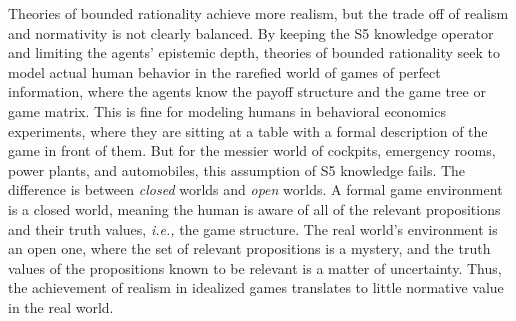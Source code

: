 Theories of bounded rationality achieve more realism, but the trade off of realism and normativity is not clearly balanced. By keeping the S5 knowledge operator and limiting the agents' epistemic depth, theories of bounded rationality seek to model actual human behavior in the rarefied world of games of perfect information, where the agents know the payoff structure and the game tree or game matrix. This is fine for modeling humans in behavioral economics experiments, where they are sitting at a table with a formal description of the game in front of them. But for the messier world of cockpits, emergency rooms, power plants, and automobiles, this assumption of S5 knowledge fails. The difference is between \emph{closed } worlds and \emph{open} worlds. A formal game environment is a closed world, meaning the human is aware of all of the relevant propositions and their truth values, \emph{i.e.,} the game structure. The real world's environment is an open one, where the set of relevant propositions is a mystery, and the truth values of the propositions known to be relevant is a matter of uncertainty. Thus, the achievement of realism in idealized games translates to little normative value in the real world.

